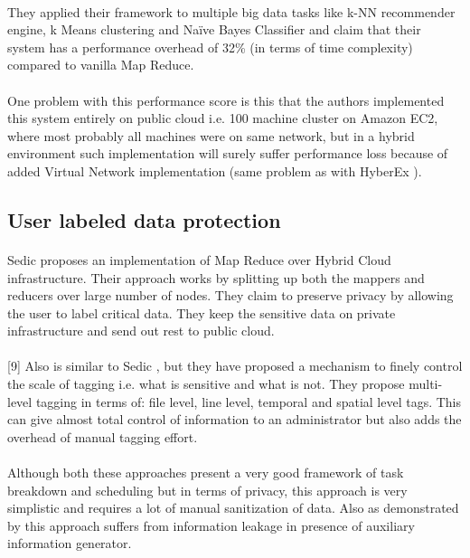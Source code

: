 \documentclass[12pt]{report}
\begin{document}
\paragraph{}
They applied their framework to multiple big data tasks like k-NN recommender engine, k Means clustering and Naïve Bayes Classifier and claim that their system has a performance overhead of 32\% (in terms of time complexity) compared to vanilla Map Reduce.
\paragraph{}
One problem with this performance score is this that the authors implemented this system entirely on public cloud i.e. 100 machine cluster on Amazon EC2, where most probably all machines were on same network, but in a hybrid environment such implementation will surely suffer performance loss because of added Virtual Network implementation (same problem as with HyberEx \cite{ko2011hybrex}).
\subsection{User labeled data protection}
\paragraph{}
Sedic \cite{zhang2011sedic} proposes an implementation of Map Reduce over Hybrid Cloud infrastructure. Their approach works by splitting up both the mappers and reducers over large number of nodes. They claim to preserve privacy by allowing the user to label critical data. They keep the sensitive data on private infrastructure and send out rest to public cloud.
\paragraph{}
[9] Also is similar to Sedic \cite{zhang2011sedic}, but they have proposed a mechanism to finely control the scale of tagging i.e. what is sensitive and what is not. They propose multi-level tagging in terms of: file level, line level, temporal and spatial level tags. This can give almost total control of information to an administrator but also adds the overhead of manual tagging effort.
\paragraph{}
Although both these approaches present a very good framework of task breakdown and scheduling but in terms of privacy, this approach is very simplistic and requires a lot of manual sanitization of data. Also as demonstrated by \cite{dwork2004privacy} this approach suffers from information leakage in presence of auxiliary information generator.
\end{document}
